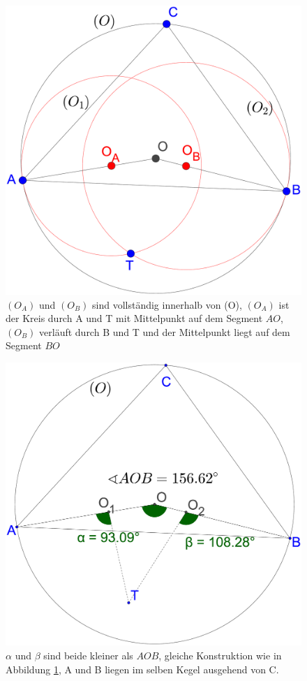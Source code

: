 \documentclass[a4paper,twoside]{IEEEtran}
\begin{document}
\begin{figure}[h!]
\centering
\includegraphics[width=0.8\linewidth]{outward_path_kreise.eps}
\caption{ $(O_A) $ und $(O_B) $ sind vollständig innerhalb von (O), $(O_A) $ ist der Kreis durch A und T mit Mittelpunkt auf dem Segment $AO $, $(O_B) $ verläuft durch B und T und der Mittelpunkt liegt auf dem Segment $BO $} 
\label{fig:outward_path_kreise}
\end{figure}

\begin{figure}[h!]
\centering
\includegraphics[width=0.8\linewidth]{outward_path_winkel.eps}
\caption{ $\alpha $ und $\beta $ sind beide kleiner als $ AOB $, gleiche Konstruktion wie in Abbildung \ref{fig:outward_path_kreise}, A und B liegen im selben Kegel ausgehend von C.}
\label{fig:outward_path_winkel}
\end{figure}
\end{document}
